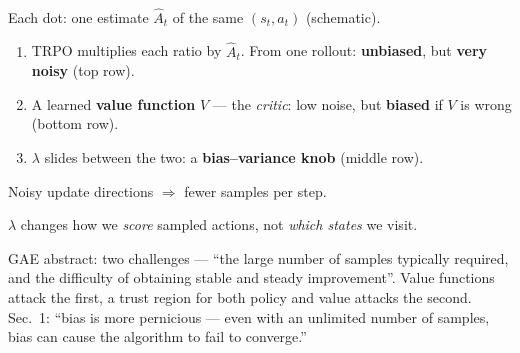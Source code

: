 \begin{minipage}[c]{0.5\linewidth}
\centering
{}\\
{\scriptsize Each dot: one estimate $\hat A_t$ of the same $(s_t,a_t)$ (schematic).}
\end{minipage}\hfill
\begin{minipage}[c]{0.47\linewidth}
\begin{enumerate}
  \item TRPO multiplies each ratio by $\hat A_t$. From one rollout: \textbf{unbiased}, but \textbf{very noisy} (top row).
  \item A learned \textbf{value function} $V$ --- the \emph{critic}: low noise, but \textbf{biased} if $V$ is wrong (bottom row).
  \item $\lambda$ slides between the two: a \textbf{bias--variance knob} (middle row).
\end{enumerate}
\end{minipage}

\begin{pair}
\begin{keybox}[title={Fixes}]
Noisy update directions $\Rightarrow$ fewer samples per step.
\end{keybox}
\begin{warnbox}[title={Not an exploration knob}]
$\lambda$ changes how we \emph{score} sampled actions, not \emph{which states} we visit.
\end{warnbox}
\end{pair}

\begin{notebox}
GAE abstract: two challenges --- ``the large number of samples typically required, and the difficulty of obtaining stable and steady improvement''. Value functions attack the first, a trust region for both policy and value attacks the second. Sec.~1: ``bias is more pernicious --- even with an unlimited number of samples, bias can cause the algorithm to fail to converge.''
\end{notebox}

